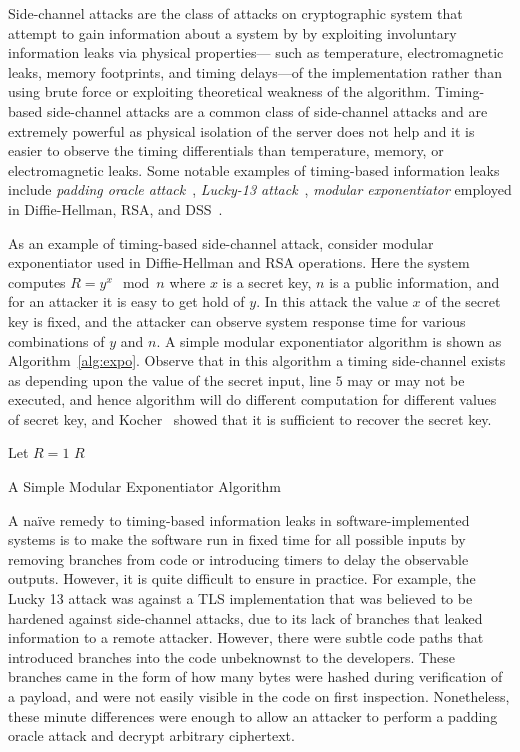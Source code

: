 Side-channel attacks are the class of attacks on cryptographic system that
attempt to gain information about a system by by exploiting involuntary
information leaks via physical properties---
such as temperature, electromagnetic leaks, memory footprints, and timing
delays---of the implementation rather than using brute force or exploiting
theoretical weakness of the algorithm.
Timing-based side-channel attacks are a common class of
side-channel attacks and are extremely powerful as physical isolation of the
server does not help and it is easier to observe the timing differentials than
temperature, memory, or electromagnetic leaks.  
Some notable examples of timing-based information leaks include \emph{padding oracle
attack}~\cite{Vau02}, \emph{Lucky-13 attack}~\cite{al2013lucky},  \emph{modular
exponentiator} employed in Diffie-Hellman, RSA, and DSS~\cite{kocher96}.

As an example of timing-based side-channel attack, consider modular
exponentiator used in Diffie-Hellman and RSA operations.
Here the system computes $R = y^x \mod n$ where $x$ is a secret key, $n$ is a
public information, and for an attacker it is easy to get hold of $y$.
In this attack the value $x$ of the secret key is fixed, and the attacker can
observe system response time for various combinations of $y$ and $n$.
A simple modular exponentiator algorithm is shown as Algorithm~\ref{alg:expo}.
Observe that in this algorithm a timing side-channel exists as depending upon
the value of the secret input, line $5$ may or may not be executed, and hence
algorithm will do different computation for different values of secret key, and
Kocher~\cite{kocher96} showed that it is sufficient to recover the secret key.
\begin{algorithm}[t]
Let $R = 1$\;
\Return $R$\;
\caption{A Simple Modular Exponentiator Algorithm}
\label{alg:expo}
\end{algorithm}

A na\"ive remedy to timing-based information leaks in software-implemented
systems is to make the software run in fixed time for all possible inputs by
removing branches from code or
introducing timers to delay the observable outputs. 
However, it is quite difficult to ensure in practice. For example, the Lucky 13
attack was against a TLS implementation that was believed to be hardened against
side-channel attacks, due to its lack of branches that leaked information to a
remote attacker. However, there were subtle code paths that introduced branches
into the code unbeknownst to the developers. These branches came in the form of
how many bytes were hashed during verification of a payload, and were not easily
visible in the code on first inspection. Nonetheless, these minute differences
were enough to allow an attacker to perform a padding oracle attack and decrypt
arbitrary ciphertext.

